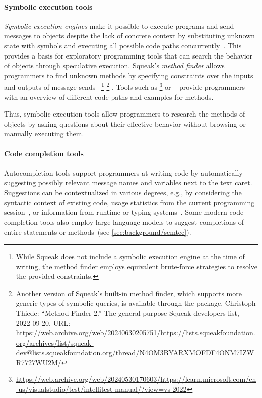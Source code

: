 	\paragraph{Symbolic execution tools}
	\label{par:background/expsys/tools/symbex}
	\emph{Symbolic execution engines} make it possible to execute programs and send messages to objects despite the lack of concrete context by substituting unknown state with symbols and executing all possible code paths concurrently~\cite{cadar2013symbolic,thiede2023symbolic}.
	This provides a basis for exploratory programming tools that can search the behavior of objects through speculative execution.
	Squeak's \emph{method finder} allows programmers to find unknown methods by specifying constraints over the inputs and outputs of message sends~\cite[sec.~1.8]{thiede2023squeak}%
	\footnote{While Squeak does not include a symbolic execution engine at the time of writing, the method finder employs equivalent brute-force strategies to resolve the provided constraints.}%
	\footnote{
		Another version of Squeak's built-in method finder, which supports more generic types of symbolic queries, is available through the  package.
		Christoph Thiede: ``Method Finder 2.'' The general-purpose Squeak developers list, 2022-09-20. URL:
		\url{https://web.archive.org/web/20240630205751/https://lists.squeakfoundation.org/archives/list/squeak-dev@lists.squeakfoundation.org/thread/N4OM3BYARXMOFDF4ONM7IZWR7727WU2M/}
	}%
	.
	Tools such as \footnote{
		\url{https://web.archive.org/web/20240530170603/https://learn.microsoft.com/en-us/visualstudio/test/intellitest-manual/?view=vs-2022}
	} or ~\cite{hentschel2019symbolic} provide programmers with an overview of different code paths and examples for methods.

	Thus, symbolic execution tools allow programmers to research the methods of objects by asking questions about their effective behavior without browsing or manually executing them.

	\paragraph{Code completion tools}
	\label{par:background/expsys/tools/completion}
	Autocompletion tools support programmers at writing code by automatically suggesting possibly relevant message names and variables next to the text caret.
	Suggestions can be contextualized in various degrees, e.g., by considering the syntactic context of existing code, usage statistics from the current programming session~\cite{robbes2008program}, or information from runtime or typing systems~\cite{haupt2011type}.
	Some modern code completion tools also employ large language models to suggest completions of entire statements or methods~(see \cref{sec:background/semtec}).


